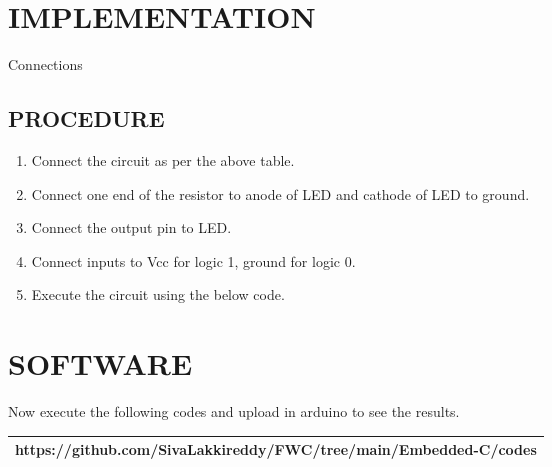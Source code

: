 \documentclass{article}
\begin{document}
\section{IMPLEMENTATION}
  \begin{table}[ht!]
    \centering	  
  
  \caption{Connections} 
  \label{Table:Connections}
  \end{table}
\bigskip

\subsection{PROCEDURE}
\begin{enumerate} 
\item Connect the circuit as per the above table.
\item Connect one end of the resistor to anode of LED and cathode of LED to ground.
\item Connect the output pin to LED.
\item Connect inputs to Vcc for logic 1, ground for logic 0.
\item Execute the circuit using the below code.
\end{enumerate}

\section{SOFTWARE}
  Now execute the following codes and upload in arduino to see the results.\\


\begin{tabularx}{1\textwidth} { 
  | >{\centering\arraybackslash}X |}
  \hline
  https://github.com/SivaLakkireddy/FWC/tree/main/Embedded-C/codes\\
  \hline
\end{tabularx}



\end{document}
